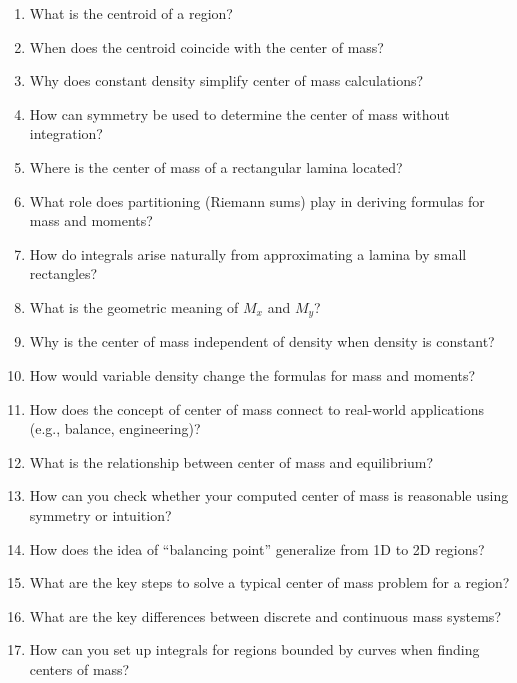 \begin{enumerate}
  \item What is the centroid of a region?
  \item When does the centroid coincide with the center of mass?
  \item Why does constant density simplify center of mass calculations?
  \item How can symmetry be used to determine the center of mass without integration?
  \item Where is the center of mass of a rectangular lamina located?
  \item What role does partitioning (Riemann sums) play in deriving formulas for mass and moments?
  \item How do integrals arise naturally from approximating a lamina by small rectangles?
  \item What is the geometric meaning of $M_x$ and $M_y$?
  \item Why is the center of mass independent of density when density is constant?
  \item How would variable density change the formulas for mass and moments?
  \item How does the concept of center of mass connect to real-world applications (e.g., balance, engineering)?
  \item What is the relationship between center of mass and equilibrium?
  \item How can you check whether your computed center of mass is reasonable using symmetry or intuition?
  \item How does the idea of “balancing point” generalize from 1D to 2D regions?
  \item What are the key steps to solve a typical center of mass problem for a region?
  \item What are the key differences between discrete and continuous mass systems?
  \item How can you set up integrals for regions bounded by curves when finding centers of mass?
\end{enumerate}
